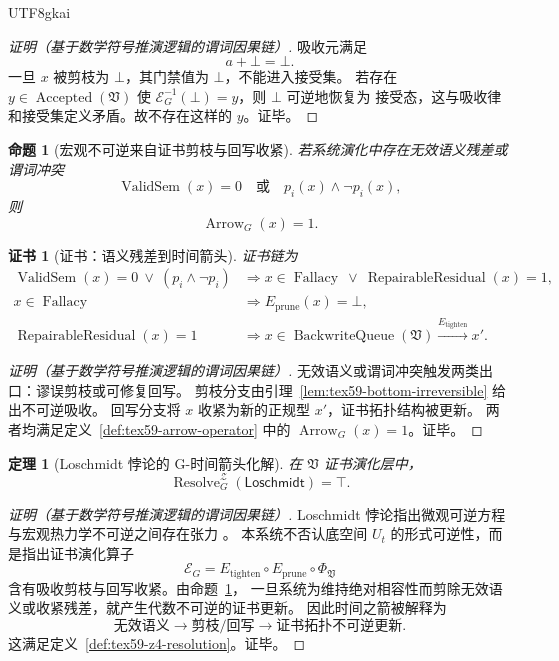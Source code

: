 \documentclass[12pt]{article}
\newtheorem{theorem}{定理}[section]
\newtheorem{proposition}{命题}[section]
\newtheorem{Certificate}{证书}[section]
\newcommand{\Vsys}{\mathfrak V}
\DeclareMathOperator{\Accepted}{Accepted}
\DeclareMathOperator{\Fallacy}{Fallacy}
\DeclareMathOperator{\Resolve}{Resolve}
\DeclareMathOperator{\BackwriteQueue}{BackwriteQueue}
\DeclareMathOperator{\ValidSem}{ValidSem}
\DeclareMathOperator{\RepairableResidual}{RepairableResidual}
\DeclareMathOperator{\Arrow}{Arrow}
\begin{document}
\begin{CJK*}{UTF8}{gkai}
\begin{proof}[证明（基于数学符号推演逻辑的谓词因果链）]
吸收元满足
\[
  a+\bot=\bot.
\]
一旦 \(x\) 被剪枝为 \(\bot\)，其门禁值为 \(\bot\)，不能进入接受集。
若存在 \(y\in\Accepted(\Vsys)\) 使 \(\mathcal E_G^{-1}(\bot)=y\)，则 \(\bot\) 可逆地恢复为
接受态，这与吸收律和接受集定义矛盾。故不存在这样的 \(y\)。证毕。
\end{proof}

\begin{proposition}[宏观不可逆来自证书剪枝与回写收紧]
\label{prop:tex59-arrow-from-prune-tighten}
若系统演化中存在无效语义残差或谓词冲突
\[
  \ValidSem(x)=0
  \quad\text{或}\quad
  p_i(x)\wedge\neg p_i(x),
\]
则
\[
  \Arrow_G(x)=1.
\]
\end{proposition}

\begin{Certificate}[证书：语义残差到时间箭头]
\label{cert:tex59-arrow-from-prune-tighten}
证书链为
\[
  \begin{aligned}
  \ValidSem(x)=0\ \vee\ (p_i\wedge\neg p_i)
  &\Longrightarrow
  x\in\Fallacy\ \vee\ \RepairableResidual(x)=1,\\
  x\in\Fallacy
  &\Longrightarrow
  E_{\mathrm{prune}}(x)=\bot,\\
  \RepairableResidual(x)=1
  &\Longrightarrow
  x\in\BackwriteQueue(\Vsys)
  \xrightarrow{E_{\mathrm{tighten}}}
  x'.
  \end{aligned}
\]
\end{Certificate}

\begin{proof}[证明（基于数学符号推演逻辑的谓词因果链）]
无效语义或谓词冲突触发两类出口：谬误剪枝或可修复回写。
剪枝分支由引理~\ref{lem:tex59-bottom-irreversible} 给出不可逆吸收。
回写分支将 \(x\) 收紧为新的正规型 \(x'\)，证书拓扑结构被更新。
两者均满足定义~\ref{def:tex59-arrow-operator} 中的 \(\Arrow_G(x)=1\)。证毕。
\end{proof}

\begin{theorem}[Loschmidt 悖论的 G-时间箭头化解]
\label{thm:tex59-loschmidt-resolution}
在 \(\Vsys\) 证书演化层中，
\[
  \Resolve_G^{\mathcal Z}(\mathsf{Loschmidt})=\top.
\]
\end{theorem}

\begin{proof}[证明（基于数学符号推演逻辑的谓词因果链）]
Loschmidt 悖论指出微观可逆方程与宏观热力学不可逆之间存在张力
\cite{Loschmidt1876SecondLaw,Boltzmann1877SecondLaw,Price1996TimeArrow}。
本系统不否认底空间 \(U_t\) 的形式可逆性，而是指出证书演化算子
\[
  \mathcal E_G
  =
  E_{\mathrm{tighten}}\circ E_{\mathrm{prune}}\circ \Phi_{\Vsys}
\]
含有吸收剪枝与回写收紧。由命题~\ref{prop:tex59-arrow-from-prune-tighten}，
一旦系统为维持绝对相容性而剪除无效语义或收紧残差，就产生代数不可逆的证书更新。
因此时间之箭被解释为
\[
  \text{无效语义}
  \to
  \text{剪枝/回写}
  \to
  \text{证书拓扑不可逆更新}.
\]
这满足定义~\ref{def:tex59-z4-resolution}。证毕。
\end{proof}


\end{CJK*}
\end{document}
